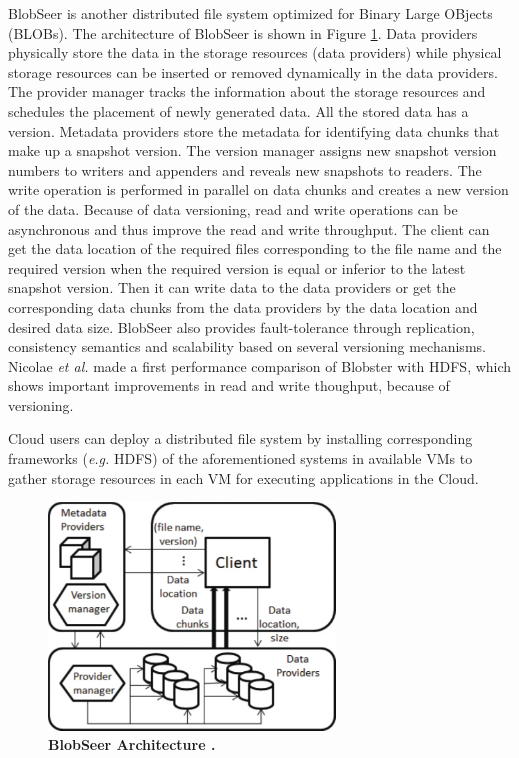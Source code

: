 BlobSeer \cite{Nicolae2011} is another distributed file system
optimized for Binary Large OBjects (BLOBs). 
The architecture of BlobSeer is shown
in Figure \ref{fig:f15}. Data providers
physically store the data in the storage resources (data providers) while physical storage resources can be inserted
or removed dynamically in the data providers. The provider manager tracks the information
about the storage resources and schedules the placement of newly generated
data. All the stored data has a version. Metadata providers store the metadata for identifying data chunks
that make up a snapshot version. The version manager assigns new snapshot version numbers to writers
and appenders and reveals new snapshots to readers. The write operation
is performed in parallel on data chunks and creates a new version of
the data.
Because of data versioning, read and write operations can be
asynchronous and thus
improve the read and write throughput. 
The client can
get the data location of the required files corresponding to the file name and the required version when the required version is
equal or inferior to the latest snapshot version. Then it can write
data to the data providers or get the corresponding data chunks from
the data providers by the data location and desired data
size. BlobSeer also provides
fault-tolerance through replication, consistency semantics
and scalability based on several versioning mechanisms.
Nicolae \textit{et al.} \cite{Nicolae2011} made a first performance comparison of Blobster with HDFS, which shows important improvements in read and write thoughput, because of versioning. 

Cloud users can deploy a distributed file system by installing corresponding frameworks (\textit{e.g.} HDFS) of the aforementioned systems in available VMs to gather storage resources in each VM for executing applications in the Cloud.

\begin{figure}
\begin{centering}
\includegraphics[width=3in]{figures/f15}
\par\end{centering}

\caption{\textbf{BlobSeer Architecture \cite{Nicolae2011}. }}
\label{fig:f15} 
\end{figure}


